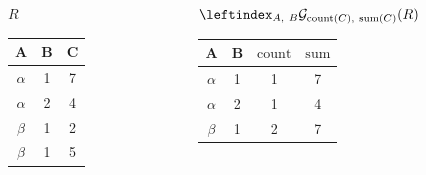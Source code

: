 \documentclass[11pt, handout]{beamer}
\begin{document}
  \begin{frame}
    \begin{columns}[T]
      \begin{column}{0.4\textwidth}
        \centering $R$
        \bigskip \\
        \begin{tabular}{|c|c|c|}
          \hline
          \textbf{A} & \textbf{B} & \textbf{C} \\[0.5ex] \hline\hline
          $\alpha$ & 1 & 7\\ \hline
          $\alpha$ & 2 & 4\\ \hline
          $\beta$ & 1 & 2\\ \hline
          $\beta$ & 1 & 5\\ \hline
        \end{tabular}
      \end{column}
      \begin{column}{0.6\textwidth}
        \centering $\leftindex_{A,\ B}{\mathcal{G}}_{\mathrm{count}(C),\ \mathrm{sum}(C)} (R)$
        \medskip \\
        \begin{tabular}{|c|c|c|c|}
          \hline
          \textbf{A} & \textbf{B} & $\mathrm{count}$ & $\mathrm{sum}$ \\[0.5ex] \hline\hline
          $\alpha$ & 1 & 1 & 7\\ \hline
          $\alpha$ & 2 & 1 & 4\\ \hline
          $\beta$ & 1 & 2 & 7\\ \hline
        \end{tabular}
      \end{column}
    \end{columns}
  \end{frame}
\end{document}
